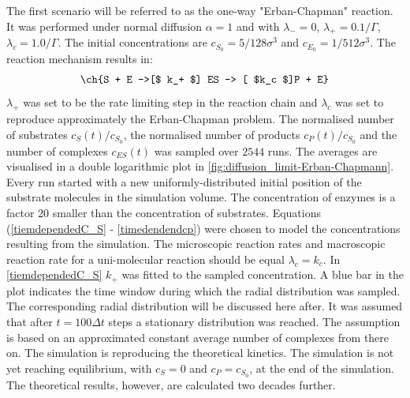 \documentclass[
  a4paper,BCOR10mm,twoside,
  headsepline,footsepline,%
  fleqn,openbib
]{scrbook}
\begin{document}
\begin{figure}

  \label{fig:diffusion_limit-Erban-Chapmann_k1}
\end{figure}
The first scenario will be referred to as the one-way "Erban-Chapman" reaction. It was performed under normal diffusion $\alpha=1$ and with $\lambda_-=0 $, $\lambda_+=0.1 /\Gamma$, $\lambda_c=1.0 /\Gamma$. The initial concentrations are $c_{S_0}=5/128\sigma^3$ and $c_{E_0}=1/512 \sigma^3$. The reaction mechanism results in:
\begin{align} \label{eq:michaelismechanismneu}
\ch{S + E ->[$ k_+ $] ES -> [ $k_c $]P + E}
\end{align}
$\lambda_+$ was set to be the rate limiting step in the reaction chain and $\lambda_c$ was set to reproduce approximately the Erban-Chapman problem.
The normalised number of substrates $c_{S}(t)/c_{S_0}$, the normalised number of products $c_{P}(t)/c_{S_0}$ and the number of complexes $c_{ES}(t)$ was sampled over $2544$ runs. The averages are visualised in a double logarithmic plot in \cref{fig:diffusion_limit-Erban-Chapmann}. Every run started with a new uniformly-distributed initial position of the substrate molecules in the simulation volume. The concentration of enzymes is a factor $20$  smaller than the concentration of substrates. Equations (\ref{tiemdependedC_S} - \ref{timedendendcp})  were chosen to model the concentrations resulting from the simulation. The microscopic reaction rates and macroscopic reaction rate for a uni-molecular reaction should be equal $\lambda_c=k_c$. In \cref{tiemdependedC_S} $k_+$ was fitted to the sampled concentration. A blue bar in the plot indicates the time window during which the radial distribution was sampled. The corresponding radial distribution will be discussed here after. It was assumed that after $t=100 \Delta t$ steps a stationary distribution was reached. The assumption is based on an approximated constant average number of complexes from there on. The simulation is reproducing the theoretical kinetics. The simulation is not yet reaching equilibrium, with $c_S=0$ and $c_P=c_{S_0}$, at the end of the simulation. The theoretical results, however, are calculated two decades further. \par
\end{document}
